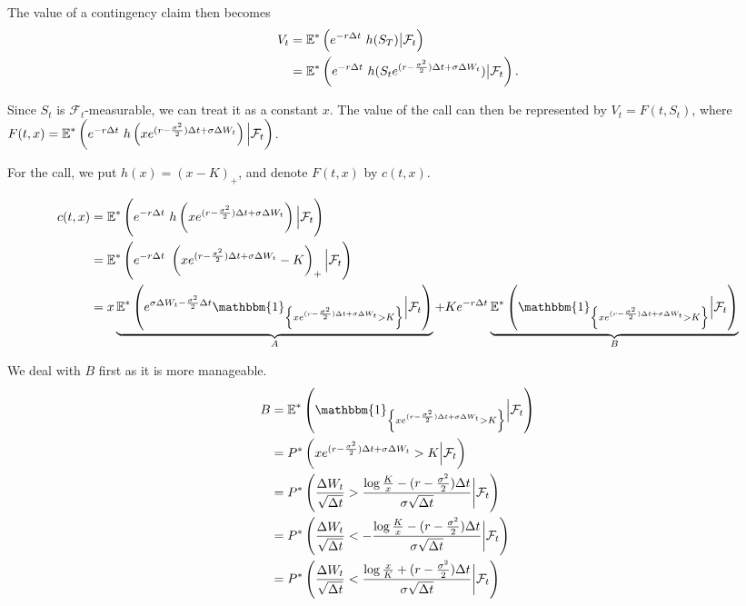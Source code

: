 The value of a contingency claim then becomes
\begin{align*}
	V_t  &=  \operatorname{\mathbb{E}}^* \left( e^{-r \Delta t} \  h(S_T)  \big|  \mathcal{F}_t \right)  \\
	     &=  \operatorname{\mathbb{E}}^* \left( e^{-r \Delta t} \  h(S_t e^{ ( r - \frac{\sigma^2}{2} ) \Delta t + \sigma \Delta W_t })  \big|  \mathcal{F}_t \right) .
\end{align*}

Since $ S_t $ is $ \mathcal{F}_t $-measurable, we can treat it as a constant $ x $. The value of the call can then be represented by $ V_t = F(t, S_t) $, where $ F(t,x) = \operatorname{\mathbb{E}}^* \left( e^{-r \Delta t} \  h \left( x e^{ ( r - \frac{\sigma^2}{2} ) \Delta t + \sigma \Delta W_t } \right)  \Big|  \mathcal{F}_t \right) $.

For the call, we put $ h(x) = (x - K)_+ $, and denote $ F(t, x) $ by $ c(t, x) $.

\begin{align*}
	c(t, x)  &=  \E^* \left( e^{-r \Delta t} \  h \left( x e^{ ( r - \frac{\sigma^2}{2} ) \Delta t + \sigma \Delta W_t } \right)  \Big|  \mathcal{F}_t \right)  \\
	&=  \E^* \left( e^{-r \Delta t} \  \left( x e^{ ( r - \frac{\sigma^2}{2} ) \Delta t + \sigma \Delta W_t } - K  \right)_+  \Big|  \mathcal{F}_t \right)  \\
	&=  x \underbrace{ \E^* \left( e^{ \sigma \Delta W_t - \frac{\sigma^2}{2} \Delta t }  \mathbbm{1}_{ \left\lbrace  x e^{ ( r - \frac{\sigma^2}{2} ) \Delta t + \sigma \Delta W_t } > K  \right\rbrace }  \Big|  \mathcal{F}_t \right) }_{A}  +  K e^{-r \Delta t}  \underbrace{ \E^* \left(  \mathbbm{1}_{ \left\lbrace  x e^{ ( r - \frac{\sigma^2}{2} ) \Delta t + \sigma \Delta W_t } > K  \right\rbrace }  \Big|  \mathcal{F}_t \right) }_{B}
\end{align*}

We deal with $ B $ first as it is more manageable.
\begin{align*}
	B  &=  \E^* \left( \mathbbm{1}_{ \left\lbrace  x e^{ ( r - \frac{\sigma^2}{2} ) \Delta t + \sigma \Delta W_t } > K  \right\rbrace }  \Big|  \mathcal{F}_t \right)  \\
	&=  P^* \left( x e^{ ( r - \frac{\sigma^2}{2} ) \Delta t + \sigma \Delta W_t } > K  \Big|  \mathcal{F}_t \right)  \\
	&=  P^* \left( \frac{ \Delta W_t }{ \sqrt{\Delta t} }  >  \frac{ \log \frac{K}{x} - ( r - \frac{\sigma^2}{2} ) \Delta t }{ \sigma \sqrt{\Delta t} }  \bigg|  \mathcal{F}_t \right)  \\
	&=  P^* \left( \frac{ \Delta W_t }{ \sqrt{\Delta t} }  <  - \frac{ \log \frac{K}{x} - ( r - \frac{\sigma^2}{2} ) \Delta t }{ \sigma \sqrt{\Delta t} }  \bigg|  \mathcal{F}_t \right)  \\
	&=  P^* \left( \frac{ \Delta W_t }{ \sqrt{\Delta t} }  <  \frac{ \log \frac{x}{K} + ( r - \frac{\sigma^2}{2} ) \Delta t }{ \sigma \sqrt{\Delta t} }  \bigg|  \mathcal{F}_t \right)
\end{align*}

